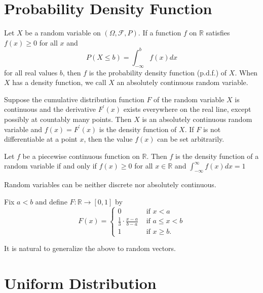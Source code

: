 \documentclass[11pt]{elegantbook}
\begin{document}
\section{Probability Density Function}

\begin{definition}
Let $X$ be a random variable on $(\Omega, \mathcal{F}, P)$. If a function $f$ on $\mathbb{R}$ satisfies $f(x) \geq 0$ for all $x$ and
$$
P(X \leq b)=\int_{-\infty}^b f(x) d x
$$
for all real values $b$, then $f$ is the probability density function (p.d.f.) of $X$. When $X$ has a density function, we call $X$ an absolutely continuous random variable.
\end{definition}

\begin{theorem}
 Suppose the cumulative distribution function $F$ of the random variable $X$ is continuous and the derivative $F^{\prime}(x)$ exists everywhere on the real line, except possibly at countably many points. Then $X$ is an absolutely continuous random variable and $f(x)=F^{\prime}(x)$ is the density function of $X$. If $F$ is not differentiable at a point $x$, then the value $f(x)$ can be set arbitrarily.
\end{theorem}

\begin{definition}
Let $f$ be a piecewise continuous function on $\mathbb{R}$. Then $f$ is the density function of a random variable if and only if
$f(x) \geq 0$ for all $x \in \mathbb{R}$ and $\int_{-\infty}^{\infty} f(x) d x=1$
\end{definition}
\begin{corollary}
    Random variables can be neither discrete nor absolutely continuous.
\end{corollary}
\begin{example}
 Fix $a<b$ and define $F: \mathbb{R} \rightarrow[0,1]$ by
$$
F(x)= \begin{cases}0 & \text { if } x<a \\ \frac{1}{3} \cdot \frac{x-a}{b-a} & \text { if } a \leq x<b \\ 1 & \text { if } x \geq b .\end{cases}
$$
\end{example}
\begin{note}
    It is natural to generalize the above to random vectors. 
\end{note}
\section{Uniform Distribution}
\end{document}
